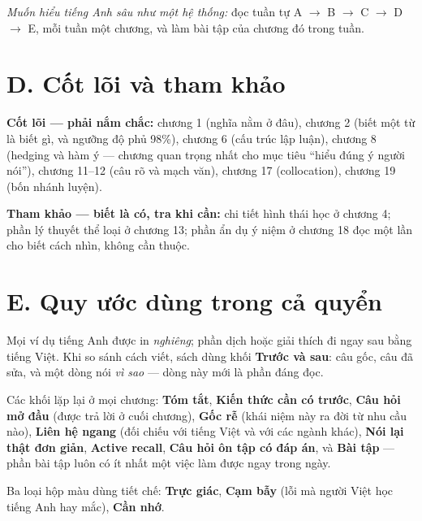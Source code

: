 \documentclass[english.tex]{subfiles}
\begin{document}
\emph{Muốn hiểu tiếng Anh sâu như một hệ thống:} đọc tuần tự A \(\rightarrow\) B \(\rightarrow\) C \(\rightarrow\) D \(\rightarrow\) E, mỗi tuần một chương, và làm bài tập của chương đó trong tuần.

\section*{D. Cốt lõi và tham khảo}

\textbf{Cốt lõi --- phải nắm chắc:} chương 1 (nghĩa nằm ở đâu), chương 2 (biết một từ là biết gì, và ngưỡng độ phủ 98\%), chương 6 (cấu trúc lập luận), chương 8 (hedging và hàm ý --- chương quan trọng nhất cho mục tiêu ``hiểu đúng ý người nói''), chương 11--12 (câu rõ và mạch văn), chương 17 (collocation), chương 19 (bốn nhánh luyện).

\textbf{Tham khảo --- biết là có, tra khi cần:} chi tiết hình thái học ở chương 4; phần lý thuyết thể loại ở chương 13; phần ẩn dụ ý niệm ở chương 18 đọc một lần cho biết cách nhìn, không cần thuộc.

\section*{E. Quy ước dùng trong cả quyển}

Mọi ví dụ tiếng Anh được in \emph{nghiêng}; phần dịch hoặc giải thích đi ngay sau bằng tiếng Việt. Khi so sánh cách viết, sách dùng khối \textbf{Trước và sau}: câu gốc, câu đã sửa, và một dòng nói \emph{vì sao} --- dòng này mới là phần đáng đọc.

Các khối lặp lại ở mọi chương: \textbf{Tóm tắt}, \textbf{Kiến thức cần có trước}, \textbf{Câu hỏi mở đầu} (được trả lời ở cuối chương), \textbf{Gốc rễ} (khái niệm này ra đời từ nhu cầu nào), \textbf{Liên hệ ngang} (đối chiếu với tiếng Việt và với các ngành khác), \textbf{Nói lại thật đơn giản}, \textbf{Active recall}, \textbf{Câu hỏi ôn tập có đáp án}, và \textbf{Bài tập} --- phần bài tập luôn có ít nhất một việc làm được ngay trong ngày.

Ba loại hộp màu dùng tiết chế: \textbf{Trực giác}, \textbf{Cạm bẫy} (lỗi mà người Việt học tiếng Anh hay mắc), \textbf{Cần nhớ}.
\end{document}
